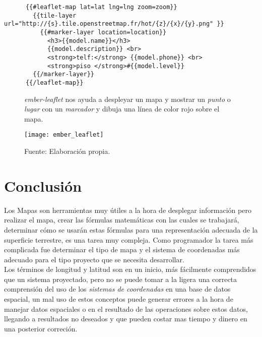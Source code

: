     \begin{verbatim}
      {{#leaflet-map lat=lat lng=lng zoom=zoom}}
        {{tile-layer url="http://{s}.tile.openstreetmap.fr/hot/{z}/{x}/{y}.png" }}
          {{#marker-layer location=location}}
            <h3>{{model.name}}</h3>
            {{model.description}} <br>
            <strong>telf:</strong> {{model.phone}} <br>
            <strong>piso </strong>#{{model.level}}
        {{/marker-layer}}
      {{/leaflet-map}}
    \end{verbatim}

    \begin{figure}[H]
          \begin{center}
            \caption{\emph{ember-leaflet} nos ayuda a despleyar un mapa y mostrar un \emph{punto} o \emph{lugar} con un \emph{marcador} y dibuja una línea de color rojo sobre el mapa.}
            \label{fig:ember_leaflet}
            \texttt{[image: ember\_leaflet]}
          \end{center}
          \caption*{Fuente: Elaboración propia.}
    \end{figure}









  \section{Conclusi\'on} %
  \label{sec:geo_conclusion}
    Los Mapas son herramientas muy útiles a la hora de desplegar información pero realizar el mapa, crear las fórmulas matemáticas con las cuales se trabajará, determinar cómo se usarán estas fórmulas para una representación adecuada de la superficie terrestre, es una tarea muy compleja. Como programador la tarea más complicada fue determinar el tipo de mapa y el sistema de coordenadas más adecuado para el tipo proyecto que se necesita desarrollar.\\

    Los términos de longitud y latitud son en un inicio, más fácilmente comprendidos que un sistema proyectado, pero no se puede tomar a la ligera una correcta comprensión del uso de los \emph{sistemas de coordenadas} en una base de datos espacial, un mal uso de estos conceptos puede generar errores a la hora de manejar datos  espaciales o en el resultado de las operaciones sobre estos  datos, llegando a resultados no deseados y que pueden costar mas tiempo y dinero en una posterior correci\'on.\\

